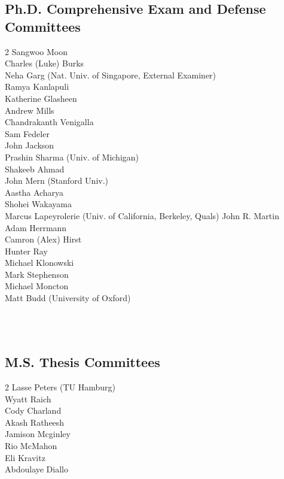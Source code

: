 \documentclass[10pt,roman]{moderncv}
\begin{document}
\begin{minipage}{\textwidth}
\subsection{Ph.D. Comprehensive Exam and Defense Committees}
\begin{multicols}{2}
    \small
    Sangwoo Moon\\
    Charles (Luke) Burks\\
    Neha Garg (Nat. Univ. of Singapore, External Examiner)\\
    Ramya Kanlapuli\\
    Katherine Glasheen\\
    Andrew Mills\\
    Chandrakanth Venigalla\\
    Sam Fedeler\\
    John Jackson\\
    Prashin Sharma (Univ. of Michigan)\\
    Shakeeb Ahmad\\
    John Mern (Stanford Univ.)\\
    Aastha Acharya\\
    Shohei Wakayama\\
    Marcus Lapeyrolerie (Univ. of California, Berkeley, Quals)
    John R. Martin\\
    Adam Herrmann\\
    Camron (Alex) Hirst\\
    Hunter Ray\\
    Michael Klonowski\\
    Mark Stephenson \\
    Michael Moncton \\
    Matt Budd (University of Oxford)
\end{multicols}
\end{minipage}\\
\\

\subsection{M.S. Thesis Committees}
\begin{multicols}{2}
    \small
    Lasse Peters (TU Hamburg)\\
    Wyatt Raich\\
    Cody Charland\\
    Akash Ratheesh\\
    Jamison Mcginley\\
    Rio McMahon\\
    Eli Kravitz\\
    Abdoulaye Diallo
\end{multicols}
\end{document}
